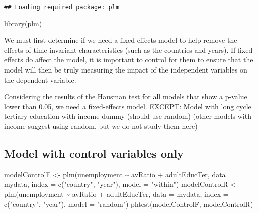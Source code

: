 \documentclass[
]{article}
\newenvironment{Shaded}{\begin{snugshade}}{\end{snugshade}}
\newcommand{\AttributeTok}[1]{\textcolor[rgb]{0.77,0.63,0.00}{#1}}
\newcommand{\FunctionTok}[1]{\textcolor[rgb]{0.00,0.00,0.00}{#1}}
\newcommand{\NormalTok}[1]{#1}
\newcommand{\OtherTok}[1]{\textcolor[rgb]{0.56,0.35,0.01}{#1}}
\newcommand{\SpecialCharTok}[1]{\textcolor[rgb]{0.00,0.00,0.00}{#1}}
\newcommand{\StringTok}[1]{\textcolor[rgb]{0.31,0.60,0.02}{#1}}
\begin{document}
\begin{verbatim}
## Loading required package: plm
\end{verbatim}

\begin{Shaded}
\begin{Highlighting}[]
\FunctionTok{library}\NormalTok{(plm)}
\end{Highlighting}
\end{Shaded}

We must first determine if we need a fixed-effects model to help remove
the effects of time-invariant characteristics (such as the countries and
years). If fixed-effects do affect the model, it is important to control
for them to ensure that the model will then be truly measuring the
impact of the independent variables on the dependent variable.

Considering the results of the Hausman test for all models that show a
p-value lower than 0.05, we need a fixed-effects model. EXCEPT: Model
with long cycle tertiary education with income dummy (should use random)
(other models with income suggest using random, but we do not study them
here)

\hypertarget{model-with-control-variables-only}{%
\subsection{Model with control variables
only}\label{model-with-control-variables-only}}

\begin{Shaded}
\begin{Highlighting}[]
\NormalTok{modelControlF }\OtherTok{\textless{}{-}} \FunctionTok{plm}\NormalTok{(unemployment }\SpecialCharTok{\textasciitilde{}}\NormalTok{  avRatio }\SpecialCharTok{+}\NormalTok{ adultEducTer,}
             \AttributeTok{data =}\NormalTok{ mydata, }\AttributeTok{index =} \FunctionTok{c}\NormalTok{(}\StringTok{"country"}\NormalTok{, }\StringTok{"year"}\NormalTok{), }\AttributeTok{model =} \StringTok{"within"}\NormalTok{)}
\NormalTok{modelControlR }\OtherTok{\textless{}{-}} \FunctionTok{plm}\NormalTok{(unemployment }\SpecialCharTok{\textasciitilde{}}\NormalTok{ avRatio }\SpecialCharTok{+}\NormalTok{ adultEducTer,}
             \AttributeTok{data =}\NormalTok{ mydata, }\AttributeTok{index =} \FunctionTok{c}\NormalTok{(}\StringTok{"country"}\NormalTok{, }\StringTok{"year"}\NormalTok{), }\AttributeTok{model =} \StringTok{"random"}\NormalTok{)}
\FunctionTok{phtest}\NormalTok{(modelControlF, modelControlR)}
\end{Highlighting}
\end{Shaded}
\end{document}
